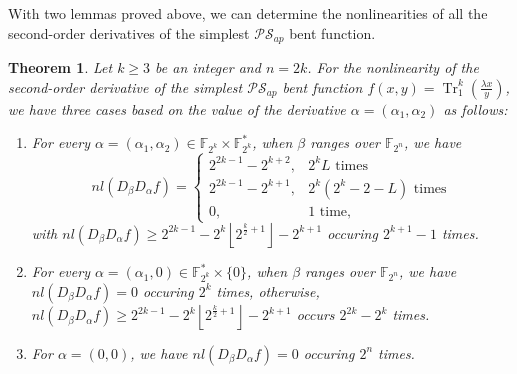 \documentclass{article}
\newcommand{\F}{\mathbb{F}}
\newcommand{\0}{\textbf{0}}
\newcommand{\1}{\textbf{1}}
\newcommand{\TRACE}{\operatorname{Tr}_1^k}
\theoremstyle{plain}
\newtheorem{theorem}{Theorem}
\begin{document}
    With two lemmas proved above, we can determine the nonlinearities of all the second-order derivatives of the simplest $\mathcal{PS}_{ap}$ bent function.
    \begin{theorem}\label{thm:nl_DaDbf}
        Let $k\ge 3$ be an integer and $n=2k$. 
        For the nonlinearity of the second-order derivative of 
        the simplest $\mathcal{PS}_{ap}$ bent function $f(x,y)=\TRACE\left(\frac{\lambda x}{y}\right)$, 
        we have three cases based on the value of the derivative $\alpha=(\alpha_1,\alpha_2)$ as follows: 
        \begin{enumerate}[label=(\arabic{*})]
            \item For every $\alpha=(\alpha_1,\alpha_2)\in\F_{2^k}\times\F_{2^k}^*$, 
            when $\beta$ ranges over $\F_{2^n}$, we have 
            \begin{equation}\label{res:nontrivil_nl}
                nl(D_{\beta}D_{\alpha}f)=\begin{cases}
                    2^{2k-1}-2^{k+2},&2^kL\text{~times}\\
                    2^{2k-1}-2^{k+1},&2^k(2^k-2-L)\text{~times}\\
                    0,&1\text{~time},%
                \end{cases}
            \end{equation}
            with $nl(D_{\beta}D_{\alpha}f)\ge 2^{2k-1}-2^k\left\lfloor 2^{\frac{k}{2}+1}\right\rfloor-2^{k+1}$ occuring $2^{k+1}-1$ times.
            \item For every $\alpha=(\alpha_1,0)\in\F_{2^k}^*\times\{0\}$, when $\beta$ ranges over $\F_{2^n}$, 
            we have $nl(D_{\beta}D_{\alpha}f)=0$ occuring $2^k$ times,  
            otherwise, $nl(D_{\beta}D_{\alpha}f)\ge 2^{2k-1}-2^k\left\lfloor 2^{\frac{k}{2}+1}\right\rfloor-2^{k+1}$ occurs $2^{2k}-2^k$ times. 
            \item For $\alpha=(0,0)$, we have $nl(D_{\beta}D_{\alpha}f) = 0$ occuring $2^n$ times.
        \end{enumerate} 
    \end{theorem}
\end{document}
